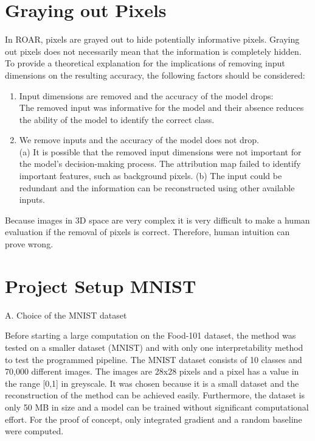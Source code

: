 \section{Graying out Pixels}
\label{gray}
In ROAR, pixels are grayed out to hide potentially informative pixels. Graying out pixels does not necessarily mean that the information is completely hidden. To provide a theoretical explanation for the implications of removing input dimensions on the resulting accuracy, the following factors\cite{hooker2019benchmark} should be considered:

\begin{enumerate}
	\item Input dimensions are removed and the accuracy of the model drops:\\ The removed input was informative for the model and their absence reduces the ability of the model to identify the correct class.
	
	\item We remove inputs and the accuracy of the model does not drop.\\ (a) It is possible that the removed input dimensions were not important for the model’s decision-making	process. The attribution map failed to identify important features, such as background pixels. (b) The input could be redundant and the information can be reconstructed using other available inputs. 
\end{enumerate}

Because images in 3D space are very complex it is very difficult to make a human evaluation if the removal of pixels is correct. Therefore, human intuition can prove wrong.


\section{Project Setup MNIST}
\label{sec:MNIST}

A. Choice of the MNIST dataset

Before starting a large computation on the Food-101 dataset, the method was tested on a smaller dataset (MNIST) and with only one interpretability method to test the programmed pipeline. The MNIST dataset consists of 10 classes and 70,000 different images. The images are 28x28 pixels and a pixel has a value in the range [0,1] in greyscale. It was chosen because it is a small dataset and the reconstruction of the method can be achieved easily. Furthermore, the dataset is only 50 MB in size and a model can be trained without significant computational effort. For the proof of concept, only integrated gradient \cite{sundararajan2017axiomatic} and a random baseline were computed.

